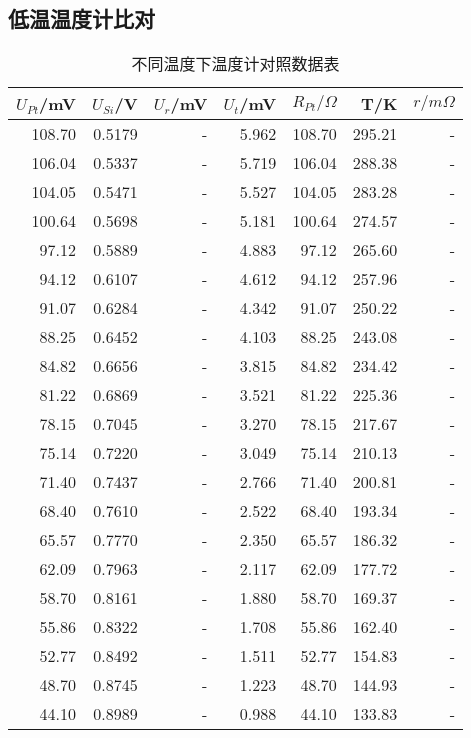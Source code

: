 \documentclass[UTF8]{ctexart}
\begin{document}
	\subsection{低温温度计比对}
	\begin{center}
\begin{longtable}{|r|r|r|r|r|r|r|}
	\caption{不同温度下温度计对照数据表}
	\label{不同温度下温度计对照数据表}\\
		\hline
		$U_{Pt}$/mV & $U_{Si}$/V & $U_{r}$/mV & $U_{t}$/mV & $R_{Pt}/\Omega$ & T/K   & $r/m\Omega$ \\
		\hline
		108.70 & 0.5179 &   -    & 5.962 & 108.70 & 295.21 &  -\\
		106.04 & 0.5337 &  -     & 5.719 & 106.04 & 288.38 &  -\\
		104.05 & 0.5471 &   -    & 5.527 & 104.05 & 283.28 &  -\\
		100.64 & 0.5698 &    -   & 5.181 & 100.64 & 274.57 & - \\
		97.12 & 0.5889 &      - & 4.883 & 97.12 & 265.60 &  -\\
		94.12 & 0.6107 &       -& 4.612 & 94.12 & 257.96 &  -\\
		91.07 & 0.6284 & -      & 4.342 & 91.07 & 250.22 &  -\\
		88.25 & 0.6452 &  -     & 4.103 & 88.25 & 243.08 &  -\\
		84.82 & 0.6656 &   -    & 3.815 & 84.82 & 234.42 &  -\\
		81.22 & 0.6869 &    -   & 3.521 & 81.22 & 225.36 &  -\\
		78.15 & 0.7045 &     -  & 3.270 & 78.15 & 217.67 &  -\\
		75.14 & 0.7220 &      - & 3.049 & 75.14 & 210.13 &  -\\
		71.40 & 0.7437 &       -& 2.766 & 71.40 & 200.81 &  -\\
		68.40 & 0.7610 &       -& 2.522 & 68.40 & 193.34 &  -\\
		65.57 & 0.7770 &       -& 2.350 & 65.57 & 186.32 &  -\\
		62.09 & 0.7963 &       -& 2.117 & 62.09 & 177.72 &  -\\
		58.70 & 0.8161 &       -& 1.880 & 58.70 & 169.37 &  -\\
		55.86 & 0.8322 &       -& 1.708 & 55.86 & 162.40 &  -\\
		52.77 & 0.8492 &       -& 1.511 & 52.77 & 154.83 & - \\
		48.70 & 0.8745 &       -& 1.223 & 48.70 & 144.93 &  -\\
		44.10 & 0.8989 &       -& 0.988 & 44.10 & 133.83 &  -\\

\end{longtable}
\end{center}
\end{document}

